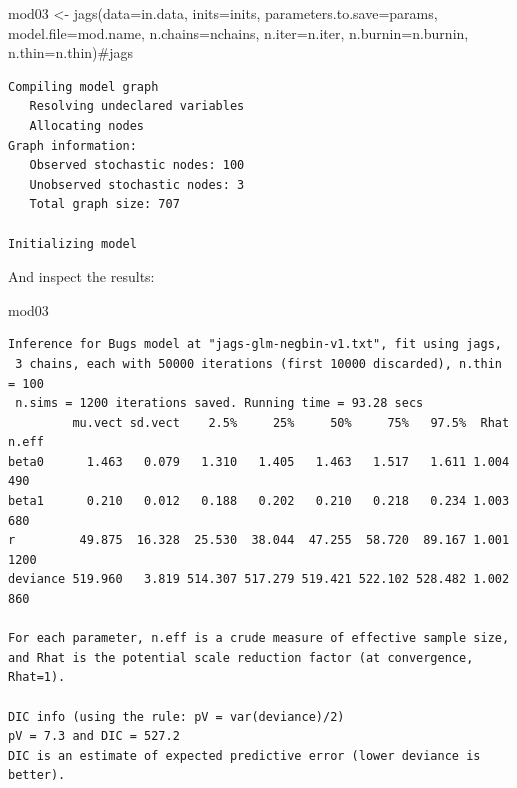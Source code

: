 \documentclass[
  13,
  letterpaper,
]{report}
\newenvironment{Shaded}{\begin{snugshade}}{\end{snugshade}}
\newcommand{\AttributeTok}[1]{\textcolor[rgb]{0.40,0.45,0.13}{#1}}
\newcommand{\CommentTok}[1]{\textcolor[rgb]{0.37,0.37,0.37}{#1}}
\newcommand{\FunctionTok}[1]{\textcolor[rgb]{0.28,0.35,0.67}{#1}}
\newcommand{\NormalTok}[1]{\textcolor[rgb]{0.00,0.23,0.31}{#1}}
\newcommand{\OtherTok}[1]{\textcolor[rgb]{0.00,0.23,0.31}{#1}}
\begin{document}
\begin{Shaded}
\begin{Highlighting}[]
\NormalTok{mod03 }\OtherTok{\textless{}{-}} \FunctionTok{jags}\NormalTok{(}\AttributeTok{data=}\NormalTok{in.data, }\AttributeTok{inits=}\NormalTok{inits,}
              \AttributeTok{parameters.to.save=}\NormalTok{params,}
              \AttributeTok{model.file=}\NormalTok{mod.name,}
              \AttributeTok{n.chains=}\NormalTok{nchains, }\AttributeTok{n.iter=}\NormalTok{n.iter,}
              \AttributeTok{n.burnin=}\NormalTok{n.burnin, }\AttributeTok{n.thin=}\NormalTok{n.thin)}\CommentTok{\#jags}
\end{Highlighting}
\end{Shaded}

\begin{verbatim}
Compiling model graph
   Resolving undeclared variables
   Allocating nodes
Graph information:
   Observed stochastic nodes: 100
   Unobserved stochastic nodes: 3
   Total graph size: 707

Initializing model
\end{verbatim}

And inspect the results:

\begin{Shaded}
\begin{Highlighting}[]
\NormalTok{mod03}
\end{Highlighting}
\end{Shaded}

\begin{verbatim}
Inference for Bugs model at "jags-glm-negbin-v1.txt", fit using jags,
 3 chains, each with 50000 iterations (first 10000 discarded), n.thin = 100
 n.sims = 1200 iterations saved. Running time = 93.28 secs
         mu.vect sd.vect    2.5%     25%     50%     75%   97.5%  Rhat n.eff
beta0      1.463   0.079   1.310   1.405   1.463   1.517   1.611 1.004   490
beta1      0.210   0.012   0.188   0.202   0.210   0.218   0.234 1.003   680
r         49.875  16.328  25.530  38.044  47.255  58.720  89.167 1.001  1200
deviance 519.960   3.819 514.307 517.279 519.421 522.102 528.482 1.002   860

For each parameter, n.eff is a crude measure of effective sample size,
and Rhat is the potential scale reduction factor (at convergence, Rhat=1).

DIC info (using the rule: pV = var(deviance)/2)
pV = 7.3 and DIC = 527.2
DIC is an estimate of expected predictive error (lower deviance is better).
\end{verbatim}
\end{document}

